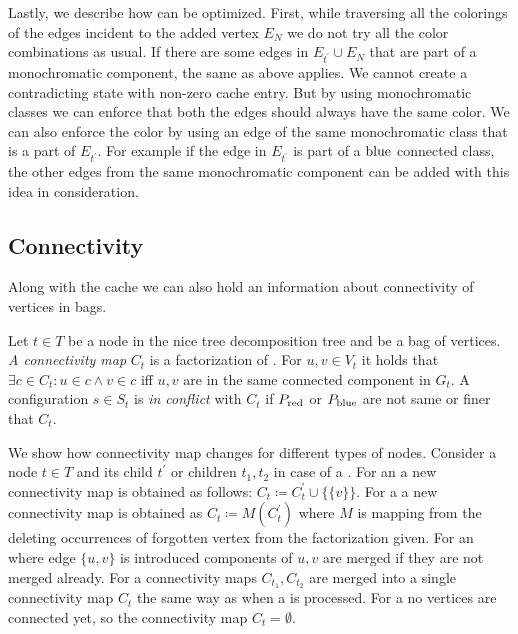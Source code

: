 Lastly, we describe how \IntroduceVertexWithEdgesNode{} can be optimized.
First, while traversing all the colorings of the edges incident to the added vertex \( E_N \)
we do not try all the color combinations as usual. If there are some edges
in \( E_{t^\prime} \cup E_N \) that are part of a monochromatic component,
the same as above applies. We cannot create a contradicting state with non-zero
cache entry. But by using monochromatic classes
we can enforce that both the edges should always have the same color.
We can also enforce the color by using an edge of the same monochromatic class
that is a part of \( E_{t^\prime} \).
For example if the edge in \( E_{t^\prime} \) is part of a \( \text{blue} \) connected class,
the other edges from the same monochromatic component can be added with
this idea in consideration.



\subsection{Connectivity}

Along with the cache we can also hold an information about connectivity of
vertices in bags.
%
\begin{definition}
	Let \( t \in T \) be a node in the nice tree decomposition tree and
	\Xt{} be a bag of vertices.
	\emph{A connectivity map} \( C_t \) is a factorization of \Xt{}.
	For \( u, v \in V_t \) it holds that
	\( \exists c \in C_t : u \in c \land v \in c \) iff
	\( u, v \) are in the same connected component in \( G_t \).
	A configuration \( s \in S_t \) is \emph{in conflict} with \( C_t \)
	if \( P_{\text{red}} \) or \( P_{\text{blue}} \) are not same or finer that \( C_t \).
\end{definition}
%
We show how connectivity map changes for different types of nodes.
Consider a node \( t \in T \) and its child \( t^\prime \)
or children \( t_1, t_2 \) in case of a \JoinNode{}.
%
For an \IntroduceVertexNode{}
a new connectivity map is obtained as follows:
\( C_t \coloneqq C_t^\prime \cup \{\{ v \}\} \).
%
For a \ForgetVertexNode{}
a new connectivity map is obtained as
\( C_t \coloneqq M(C_t^\prime) \)
where \( M \) is mapping from the \ForgetVertexNode{}
deleting occurrences of forgotten vertex from the factorization given.
%
For an \IntroduceEdgeNode{}
where edge \( \{u, v\} \) is introduced
components of \( u, v \) are merged if they are not merged already.
%
For a \JoinNode{}
connectivity maps \( C_{t_1}, C_{t_2} \) are merged into
a single connectivity map \( C_t \)
the same way as when a \JoinNode{} is processed.
%
For a \LeafNode{}
no vertices are connected yet, so the connectivity map \( C_t = \emptyset \).

